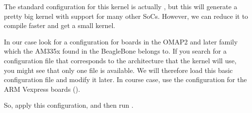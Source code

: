{The standard configuration for this kernel is actually ,
but this will generate a pretty big kernel with support for many other
SoCs. However, we can reduce it to compile faster and get a small
kernel.}{}

{In our case look for a configuration for boards in the OMAP2 and
later family which the AM335x found in the BeagleBone belongs to.}{}
{If you search for a configuration file that corresponds to the 
architecture that the kernel will use, you might see that only one
 file is available. We will therefore load this basic
configuration file and modify it later.}{}
{In course case, use the configuration for the ARM Vexpress boards
().}{}


So, apply this configuration, and then run .


